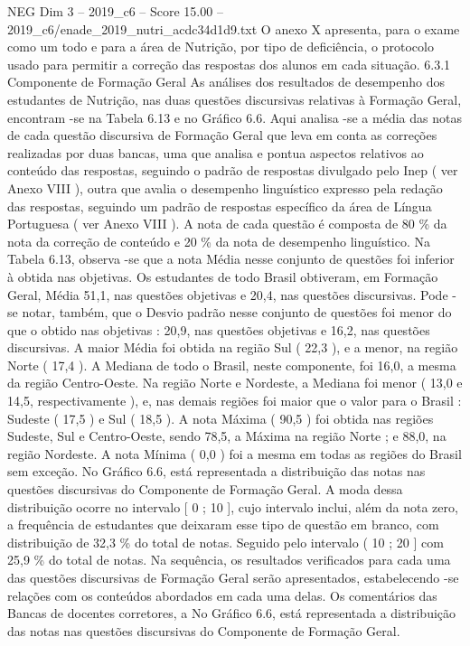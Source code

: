 \begin{textsample}{NEG Dim 3 – 2019\_c6 – Score 15.00 – 2019\_c6/enade\_2019\_nutri\_acdc34d1d9.txt}
O anexo X apresenta, para o exame como um todo e para a área de Nutrição, por tipo de deficiência, o protocolo usado para permitir a correção das respostas dos alunos em cada situação. 6.3.1 Componente de Formação Geral As análises dos resultados de desempenho dos estudantes de Nutrição, nas duas questões discursivas relativas à Formação Geral, encontram -se na Tabela 6.13 e no Gráfico 6.6.
Aqui analisa -se a média das notas de cada questão discursiva de Formação Geral que leva em conta as correções realizadas por duas bancas, uma que analisa e pontua aspectos relativos ao conteúdo das respostas, seguindo o padrão de respostas divulgado pelo Inep ( ver Anexo VIII ), outra que avalia o desempenho linguístico expresso pela redação das respostas, seguindo um padrão de respostas específico da área de Língua Portuguesa ( ver Anexo VIII ).
A nota de cada questão é composta de 80 \% da nota da correção de conteúdo e 20 \% da nota de desempenho linguístico.
Na Tabela 6.13, observa -se que a nota Média nesse conjunto de questões foi inferior à obtida nas objetivas.
Os estudantes de todo Brasil obtiveram, em Formação Geral, Média 51,1, nas questões objetivas e 20,4, nas questões discursivas.
Pode -se notar, também, que o Desvio padrão nesse conjunto de questões foi menor do que o obtido nas objetivas : 20,9, nas questões objetivas e 16,2, nas questões discursivas.
A maior Média foi obtida na região Sul ( 22,3 ), e a menor, na região Norte ( 17,4 ).
A Mediana de todo o Brasil, neste componente, foi 16,0, a mesma da região Centro-Oeste.
Na região Norte e Nordeste, a Mediana foi menor ( 13,0 e 14,5, respectivamente ), e, nas demais regiões foi maior que o valor para o Brasil : Sudeste ( 17,5 ) e Sul ( 18,5 ).
A nota Máxima ( 90,5 ) foi obtida nas regiões Sudeste, Sul e Centro-Oeste, sendo 78,5, a Máxima na região Norte ; e 88,0, na região Nordeste.
A nota Mínima ( 0,0 ) foi a mesma em todas as regiões do Brasil sem exceção.
No Gráfico 6.6, está representada a distribuição das notas nas questões discursivas do Componente de Formação Geral.
A moda dessa distribuição ocorre no intervalo [ 0 ; 10 ], cujo intervalo inclui, além da nota zero, a frequência de estudantes que deixaram esse tipo de questão em branco, com distribuição de 32,3 \% do total de notas.
Seguido pelo intervalo ( 10 ; 20 ] com 25,9 \% do total de notas.
Na sequência, os resultados verificados para cada uma das questões discursivas de Formação Geral serão apresentados, estabelecendo -se relações com os conteúdos abordados em cada uma delas.
Os comentários das Bancas de docentes corretores, a No Gráfico 6.6, está representada a distribuição das notas nas questões discursivas do Componente de Formação Geral.

\end{textsample}
